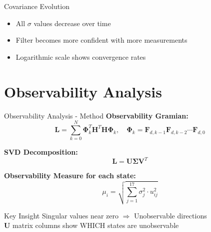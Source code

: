 \documentclass{beamer}
\begin{document}
\begin{frame}{Covariance Evolution}
\begin{center}
\end{center}

\begin{itemize}
    \item All $\sigma$ values decrease over time
    \item Filter becomes more confident with more measurements
    \item Logarithmic scale shows convergence rates
\end{itemize}
\end{frame}

\section{Observability Analysis}

\begin{frame}{Observability Analysis - Method}
\textbf{Observability Gramian:}
\begin{equation*}
    \mathbf{L} = \sum_{k=0}^{N} \bm{\Phi}_k^T \mathbf{H}^T \mathbf{H} \bm{\Phi}_k, \quad \bm{\Phi}_k = \mathbf{F}_{d,k-1} \mathbf{F}_{d,k-2} \cdots \mathbf{F}_{d,0}
\end{equation*}

\vspace{0.1cm}
\textbf{SVD Decomposition:}
\begin{equation*}
    \mathbf{L} = \mathbf{U} \bm{\Sigma} \mathbf{V}^T
\end{equation*}

\vspace{0.1cm}
\textbf{Observability Measure for each state:}
\begin{equation*}
    \mu_i = \sqrt{\sum_{j=1}^{17} \sigma_j^2 \cdot u_{ij}^2}
\end{equation*}

\vspace{0.1cm}
\begin{block}{Key Insight}
Singular values near zero $\Rightarrow$ Unobservable directions\\
$\mathbf{U}$ matrix columns show WHICH states are unobservable
\end{block}
\end{frame}
\end{document}
